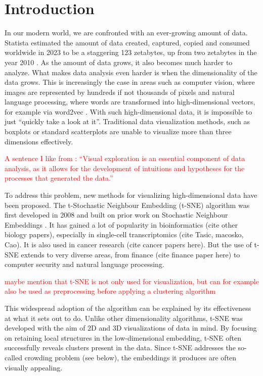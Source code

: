\chapter{Introduction}

In our modern world, we are confronted with an ever-growing amount of data. 
Statista estimated the amount of data created, captured, copied and consumed worldwide in 2023 to be a staggering 123 zetabytes, up from two zetabytes in the year 2010 \cite{Statista}.
As the amount of data grows, it also becomes much harder to analyze. 
What makes data analysis even harder is when the dimensionality of the data grows. 
This is increasingly the case in areas such as computer vision, where images are represented by hundreds if not thousands of pixels and natural language processing, where words are transformed into high-dimensional vectors, for example via word2vec \cite{word2vec}.
With such high-dimensional data, it is impossible to just \enquote{quickly take a look at it}. 
Traditional data visualization methods, such as boxplots or standard scatterplots are unable to visualize more than three dimensions effectively. 

\textcolor{red}{A sentence I like from \cite{vdMaa14}: \enquote{Visual exploration is an essential component of data analysis, as it allows for the development of intuitions and hypotheses for the processes that generated the data.}} 

To address this problem, new methods for visualizing high-dimensional data have been proposed. 
The t-Stochastic Neighbour Embedding (t-SNE) algorithm was first developed in 2008 \cite{vdMaa08} and built on prior work on Stochastic Neighbour Embeddings \cite{Hinton02}. 
It has gained a lot of popularity in bioinformatics (cite other biology papers), especially in  single-cell transcriptomics (cite Tasic, macosko, Cao). 
It is also used in cancer research (cite cancer papers here). 
But the use of t-SNE extends to very diverse areas, from finance (cite finance paper here) to computer security and natural language processing. 

\textcolor{red}{maybe mention that t-SNE is not only used for visualization, but can for example also be used as preprocessing before applying a clustering algorithm}

This widespread adoption of the algorithm can be explained by its effectiveness at what it sets out to do. Unlike other dimensionality algorithms, t-SNE was developed with the aim of 2D and 3D visualizations of data in mind. 
By focusing on retaining local structures in the low-dimensional embedding, t-SNE often successfully reveals clusters present in the data. 
Since t-SNE addresses the so-called crowding problem (see below), the embeddings it produces are often visually appealing.  

